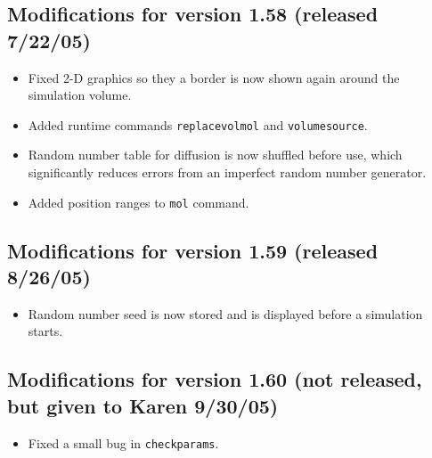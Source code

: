 \documentclass {scrbook}
\newcommand {\ttt} {\texttt}
\begin{document}
\subsection{Modifications for version 1.58 (released 7/22/05)}
\begin{itemize}
\item Fixed 2-D graphics so they a border is now shown again around the simulation volume.
\item Added runtime commands \ttt{replacevolmol} and \ttt{volumesource}.
\item Random number table for diffusion is now shuffled before use, which significantly reduces errors from an imperfect random number generator.
\item Added position ranges to \ttt{mol} command.
\end{itemize}

\subsection{Modifications for version 1.59 (released 8/26/05)}
\begin{itemize}
\item Random number seed is now stored and is displayed before a simulation starts.
\end{itemize}

\subsection{Modifications for version 1.60 (not released, but given to Karen 9/30/05)}
\begin{itemize}
\item Fixed a small bug in \ttt{checkparams}.
\end{itemize}
\end{document}
